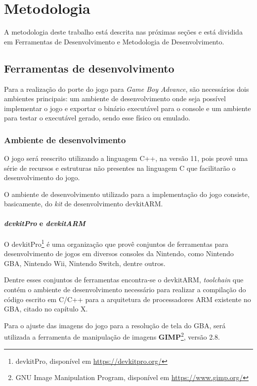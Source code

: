 \chapter[Metodologia]{Metodologia}

A metodologia deste trabalho está descrita nas próximas seções e está dividida em Ferramentas de Desenvolvimento e Metodologia de Desenvolvimento.

\section{Ferramentas de desenvolvimento}

  Para a realização do porte do jogo para \textit{Game Boy Advance}, são necessários dois ambientes principais: um ambiente de desenvolvimento onde seja possível implementar o jogo e exportar o binário executável para o console e um ambiente para testar o executável gerado, sendo esse físico ou emulado.

  \subsection{Ambiente de desenvolvimento}

    O jogo será reescrito utilizando a linguagem C++, na versão 11, pois provê uma série de recursos e estruturas não presentes na linguagem C que facilitarão o desenvolvimento do jogo.

    O ambiente de desenvolvimento utilizado para a implementação do jogo consiste, basicamente, do \textit{kit} de desenvolvimento devkitARM.

    \subsubsection{\textit{devkitPro} e \textit{devkitARM}}

      O devkitPro\footnote{devkitPro, disponível em \url{https://devkitpro.org/}} é uma organização que provê conjuntos de ferramentas para desenvolvimento de jogos em diversos consoles da Nintendo, como Nintendo GBA, Nintendo Wii, Nintendo Switch, dentre outros.

      Dentre esses conjuntos de ferramentas encontra-se o devkitARM, \textit{toolchain} que contém o ambiente de desenvolvimento necessário para realizar a compilação do código escrito em C/C++ para a arquitetura de processadores ARM existente no GBA, citado no capítulo X.

    Para o ajuste das imagens do jogo para a resolução de tela do GBA, será utilizada a ferramenta de manipulação de imagens \textbf{GIMP}\footnote{GNU Image Manipulation Program, disponível em \url{https://www.gimp.org/}}, versão 2.8.


